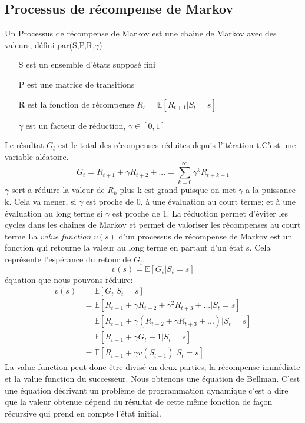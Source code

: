 \documentclass[a4paper,10pt]{article}
\begin{document}
\subsection{Processus de récompense de Markov}
Un Processus de récompense de Markov est une chaine de Markov avec des valeurs, défini par(S,P,R,$\gamma$) 
\begin{itemize}
\item[S] est un ensemble d'états supposé fini
\item[P] est une matrice de transitions 
\item[R] est la fonction de récompense $R_s = \mathbb{E}[R_{t+1}|S_t =s]$
\item[$\gamma$] est un facteur de réduction, $\gamma \in [0,1]$
\end{itemize}
\vspace{12pt}
Le résultat $G_t$ est le total des récompenses réduites depuis l'itération t.C'est une variable aléatoire.
\[G_t = R_{t+1}+\gamma R_{t+2}+...= \sum_{k=0}^{\infty}\gamma^k R_{t+k+1}\]
$\gamma$ sert a réduire la valeur de $R_k$ plus k est grand puisque on met $\gamma$ a la puissance k. Cela va mener, si  $\gamma$ est proche de 0, à une évaluation au court terme; et à une évaluation au long terme si  $\gamma$ est proche de 1. La réduction permet d'éviter les cycles dans les chaines de Markov  et permet de valoriser les récompenses au court terme 
La \textit{value function} $v(s)$ d'un processus de récompense de Markov est un fonction qui retourne la valeur au long terme en partant d'un état s. Cela représente l'espérance du retour de $G_t$.
\[v(s)=\mathbb{E}[G_t|S_t=s]\]
équation que nous pouvons réduire:
\[
\begin{aligned}
v(s)&=\mathbb{E}[G_t|S_t=s]\\
&=\mathbb{E}[R_{t+1}+\gamma R_{t+2}+\gamma^2R_{t+3}+...|S_t=s]\\
&=\mathbb{E}[R_{t+1}+\gamma(R_{t+2}+\gamma R_{t+3}+...)|S_t=s]\\
&=\mathbb{E}[R_{t+1}+\gamma G_t+1 |S_t=s]\\
&=\mathbb{E}[R_{t+1}+\gamma v(S_{t+1}) |S_t=s]
\end{aligned}
\]
La value function peut donc être divisé en deux parties, la récompense immédiate et la value function du successeur. Nous obtenons une équation de Bellman.
C'est une équation décrivant un problème de programmation dynamique c'est a dire que la valeur obtenue dépend du résultat de cette même fonction de façon récursive qui prend en compte l'état initial.
\\
\end{document}
